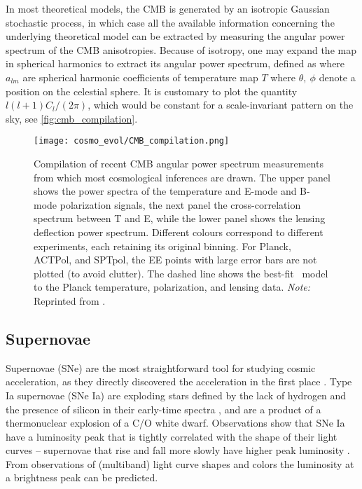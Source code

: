 In most theoretical models, the CMB is generated by an isotropic Gaussian stochastic process, in which case all the available information concerning the underlying theoretical model can be extracted by measuring the angular power spectrum of the CMB anisotropies. Because of isotropy, one may expand the map in spherical harmonics to extract its angular power spectrum, defined as \parencite{2015IJMPD..2430004B}
where $a_{lm}$ are spherical harmonic coefficients of temperature map $T$
where $\theta,\ \phi$  denote a position on the celestial sphere. It is customary to plot the quantity $l(l+1)C_l/(2\pi)$, which would be constant for a scale-invariant pattern on the sky, see \autoref{fig:cmb_compilation}.
\begin{figure}[!hbt]
    \centering
    \texttt{[image: cosmo\_evol/CMB\_compilation.png]}
    \caption{Compilation of recent CMB angular power spectrum measurements from which most cosmological inferences are drawn. The upper panel shows the power spectra of the temperature and E-mode and B-mode polarization signals, the next panel the cross-correlation spectrum between T and E, while the lower panel shows the lensing deflection power spectrum. Different colours correspond to different experiments, each retaining its original binning. For Planck, ACTPol, and SPTpol, the EE points with large error bars are not plotted (to avoid clutter). The dashed line shows the best-fit \LCDM\ model to the Planck temperature, polarization, and lensing data. \textit{Note:} Reprinted from \textcite{2018arXiv180706205P}.}
    \label{fig:cmb_compilation}
\end{figure}
\subsection{Supernovae}
Supernovae (SNe) are the most straightforward tool for studying cosmic acceleration, as they directly discovered the acceleration in the first place \parencite{riess}. Type Ia supernovae (SNe Ia) are exploding stars defined by the lack of hydrogen and the presence of silicon in their early-time spectra \parencite{SN}, and are a product of a thermonuclear explosion of a C/O white dwarf. Observations show that SNe Ia have a luminosity peak that is tightly correlated with the shape of their light curves -- supernovae that rise and fall more slowly have higher peak luminosity \parencite[first quantified by][]{SN_lum}. From observations of (multiband) light curve shapes and colors the luminosity at a brightness peak can be predicted.

